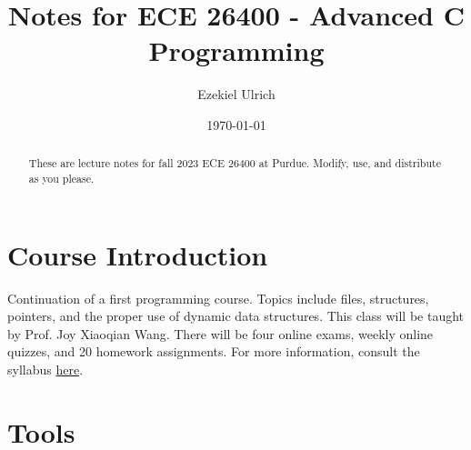 \documentclass[nobib]{tufte-handout}
\title{Notes for ECE 26400 - Advanced C Programming}
\author[Ezekiel Ulrich]{Ezekiel Ulrich}
\date{\today}  %
\begin{document}
\maketitle

\begin{abstract}
These are lecture notes for fall 2023 ECE 26400 at Purdue. Modify, use, and distribute as you please.
\end{abstract}

\tableofcontents 

\section{Course Introduction}
Continuation of a first programming course. 
Topics include files, structures, pointers, and the proper use of dynamic data structures.
This class will be taught by Prof. Joy Xiaoqian Wang. There will be four online exams, 
weekly online quizzes, and 20 homework assignments. For more information, 
consult the syllabus \href{https://github.com/ezekielulrich/Notes/blob/d83855d25b40c224ce70b0b46ae6a86adc5a783f/ECE%20264%20Fall%202023%20Syllabus.pdf}{here}.

\pagebreak 

\section{Tools}
\end{document}
